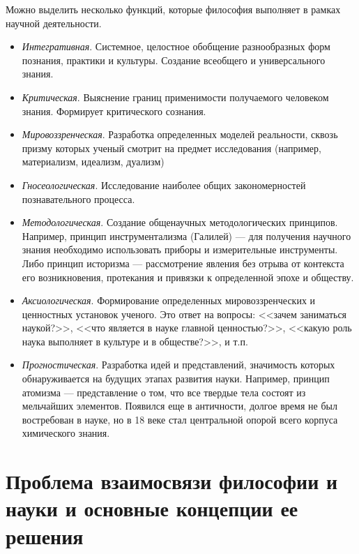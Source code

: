 Можно выделить несколько функций, которые философия выполняет в рамках научной деятельности.
\begin{itemize}
    \item \textit{Интегративная}. 
    Системное, целостное обобщение разнообразных форм познания, практики и культуры. Создание всеобщего и универсального знания.

    \item \textit{Критическая}. 
    Выяснение границ применимости получаемого человеком знания. Формирует критического сознания.  

    \item \textit{Мировоззренческая}. 
    Разработка определенных моделей реальности, сквозь призму которых ученый смотрит на предмет исследования (например, материализм, идеализм, дуализм)

    \item \textit{Гносеологическая}. 
    Исследование наиболее общих закономерностей познавательного процесса.

    \item \textit{Методологическая}. 
    Создание общенаучных методологических принципов. 
    Например, принцип инструментализма (Галилей) — для получения научного знания необходимо использовать приборы и измерительные инструменты.
    Либо принцип историзма — рассмотрение явления без отрыва от контекста его возникновения, протекания и привязки к определенной эпохе и обществу.
    
    \item \textit{Аксиологическая}. 
    Формирование определенных мировоззренческих и ценностных установок ученого. Это ответ на вопросы: <<зачем заниматься наукой?>>, <<что является в науке главной ценностью?>>, <<какую роль наука выполняет 
    в культуре и в обществе?>>, и т.п.

    \item \textit{Прогностическая}. 
    Разработка идей и представлений, значимость которых обнаруживается на будущих этапах развития науки. 
    Например, принцип атомизма — представление о том, что все твердые тела состоят из мельчайших элементов. Появился еще в античности, долгое время не был востребован в науке, но в 18 веке стал центральной опорой 
    всего корпуса химического знания. 
\end{itemize}
	
	\section {Проблема взаимосвязи философии и науки и основные концепции ее решения}

